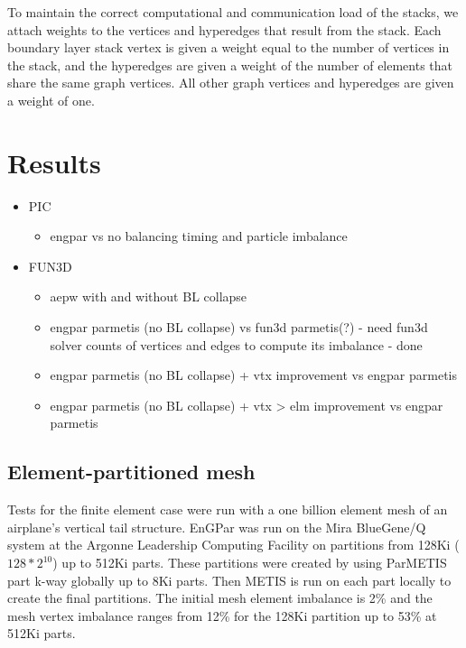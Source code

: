 \documentclass[conference]{IEEEtran}
\begin{document}
To maintain the correct computational and communication load of the stacks,
we attach weights to the vertices and hyperedges that result from the stack. Each boundary layer
stack vertex is given a weight equal to the number of vertices in the stack, and the hyperedges
are given a weight of the number of elements that share the same graph vertices. All other
graph vertices and hyperedges are given a weight of one.


\section{Results}
\begin{itemize}
\item PIC
\begin{itemize}
  \item engpar vs no balancing timing and particle imbalance
\end{itemize}
\item FUN3D
\begin{itemize}
  \item aepw with and without BL collapse
  \item engpar parmetis (no BL collapse) vs fun3d parmetis(?) - need fun3d 
    solver counts of vertices and edges to compute its imbalance - done
  \item engpar parmetis (no BL collapse) + vtx improvement vs engpar parmetis
  \item engpar parmetis (no BL collapse) + vtx > elm improvement vs engpar parmetis
\end{itemize}
\end{itemize}

\subsection{Element-partitioned mesh}

Tests for the finite element case were run with a one billion element mesh of an airplane's
vertical tail structure. EnGPar was run on the Mira BlueGene/Q system at the Argonne Leadership
Computing Facility \cite{haring2012ibm} on partitions from 128Ki ($128*2^{10}$) up to 512Ki parts.
These partitions were created by using ParMETIS part k-way \cite{karypis1999parallel} globally
up to 8Ki parts. Then METIS is run on each part locally to create the final partitions.
The initial mesh element imbalance is 2\% and the mesh vertex imbalance ranges from 12\% for
the 128Ki partition up to 53\% at 512Ki parts.
\end{document}
